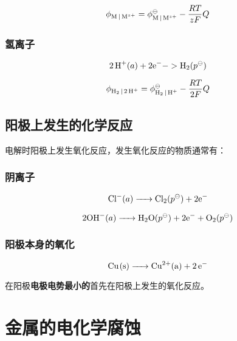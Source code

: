 \begin{equation*}
    \phi_{\ce{M | M^z+}} = \phi_{\ce{M | M^z+}}^\ominus - \frac{RT}{zF} Q
\end{equation*}

\subsubsection{氢离子}

\begin{equation*}
    \ce{2H^+}(a)+ 2\ce{e-} -> \ce{H2}(p^\ominus)
\end{equation*}


\begin{equation*}
    \phi_{\ce{H2 | 2H^+}} = \phi_{\ce{H2 | H^+}}^\ominus - \frac{RT}{2F} Q
\end{equation*}

\subsection{阳极上发生的化学反应}

电解时阳极上发生氧化反应，发生氧化反应的物质通常有：

\subsubsection{阴离子}

\begin{equation*}
    \ce{Cl-}(a) \ce{->} \ce{Cl2}(p^\ominus) + 2\ce{e-}
\end{equation*}


\begin{equation*}
    2\ce{OH-}(a) \ce{->} \ce{H2O}(p^\ominus) + 2\ce{e-} + \ce{O2}(p^\ominus)
\end{equation*}


\subsubsection{阳极本身的氧化}

\begin{equation*}
    \ce{Cu(s) -> Cu^2+(a) + 2e-}
\end{equation*}


在阳极\textbf{电极电势最小的}首先在阳极上发生的氧化反应。


\section{金属的电化学腐蚀}


